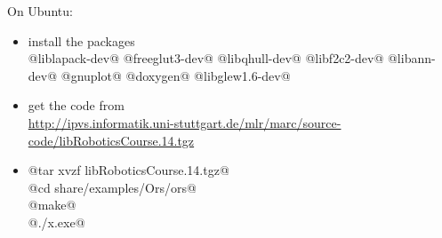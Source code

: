 On Ubuntu:
\begin{itemize}
\item install the packages \\ {\small @liblapack-dev@ @freeglut3-dev@
@libqhull-dev@ @libf2c2-dev@ @libann-dev@ @gnuplot@ @doxygen@ @libglew1.6-dev@}
\item get the code
from \\ {\small\url{http://ipvs.informatik.uni-stuttgart.de/mlr/marc/source-code/libRoboticsCourse.14.tgz}}
\item {\small
@tar xvzf libRoboticsCourse.14.tgz@\\
@cd share/examples/Ors/ors@\\
@make@\\
@./x.exe@

}
\end{itemize}




\exerfoot

